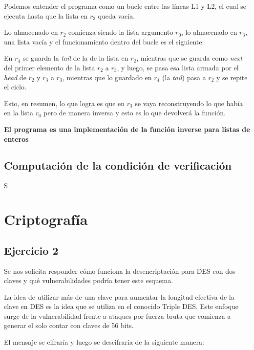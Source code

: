 \documentclass[11pt]{article}
\begin{document}
Podemos entender el programa como un bucle entre las 
líneas L1 y L2, el cual se ejecuta hasta que la lista
en $r_2$ queda vacía.

Lo almacenado en $r_2$ comienza siendo la lista argumento $r_0$, lo almacenado en $r_3$, 
una lista vacía y el funcionamiento dentro del bucle 
es el siguiente:

En $r_4$ se guarda la \textit{tail} de la de la lista en $r_2$, mientras que 
se guarda como \textit{next} del primer elemento de la lista $r_2$
a $r_3$, y luego, se pasa esa lista armada por el \textit{head} de $r_2$ y $r_3$ a $r_3$, mientras que
lo guardado en $r_4$ (la \textit{tail}) pasa a $r_2$ y se 
repite el ciclo.

Esto, en resumen, lo que logra es que en $r_3$ se vaya
reconstruyendo lo que había en la lista $r_0$ pero de manera inversa
y esto es lo que devolverá la función. 

\textbf{El programa es una implementación de la función inverse para listas de enteros}

\subsection{Computación de la condición de verificación}

S

\section{Criptografía}

\subsection*{Ejercicio 2}
Se nos solicita responder cómo funciona la desencriptación para DES con dos claves y 
qué vulnerabilidades podría tener este esquema.

La idea de utilizar más de una clave para aumentar la longitud efectiva de la clave en DES es la idea 
que se utiliza en el conocido Triple DES. Este enfoque surge de la vulnerabilidad frente a ataques por fuerza bruta 
que comienza a generar el solo contar con claves de 56 bits.

El mensaje se cifraría y luego se descifraría de la siguiente manera:
\end{document}
